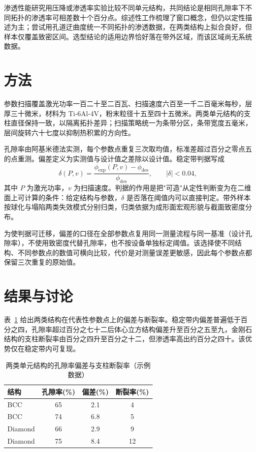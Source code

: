 \documentclass[11pt]{article}
\begin{document}
渗透性能研究用压降或渗透率实验比较不同单元结构，共同结论是相同孔隙率下不同拓扑的渗透率可相差数十个百分点\cite{kumar2018}。综述性工作梳理了窗口概念，但仍以定性描述为主\cite{liu2022}；\cite{zheng2023}尝试用孔道迂曲度统一不同拓扑的渗透数据，在两类结构上拟合良好，但样本仅覆盖致密区间。选型结论的适用边界恰好落在带外区域，而该区域尚无系统数据。

\section{方法}
参数扫描覆盖激光功率一百二十至二百瓦、扫描速度六百至一千二百毫米每秒，层厚三十微米，材料为 Ti-6Al-4V，粉末粒径十五至四十五微米。两类单元结构的支柱直径保持一致，以隔离拓扑差异；扫描策略统一为条带分区，条带宽度五毫米，层间旋转六十七度以抑制热积累的方向性。

孔隙率由阿基米德法实测，每个参数点重复三次取均值，标准差超过百分之零点五的点重测。偏差定义为实测值与设计值之差除以设计值。稳定带判据写成
\begin{equation}
\delta(P,v) = \frac{\phi_{\mathrm{exp}}(P,v) - \phi_{\mathrm{des}}}{\phi_{\mathrm{des}}}, \qquad |\delta| < 0.04,
\end{equation}
其中 $P$ 为激光功率，$v$ 为扫描速度。判据的作用是把"可造"从定性判断变为在二维面上可计算的条件：给定结构与参数，$\delta$ 是否落在阈值内可以直接判定。带外样本按球化与塌陷两类失效模式分别归类，归类依据为成形面宏观形貌与截面致密度分布。

为使判据可迁移，偏差的口径在全部参数点复用同一测量流程与同一基准（设计孔隙率），不使用致密度代替孔隙率，也不按设备单独标定阈值。该选择使不同结构、不同参数点的数值可横向比较，代价是对测量误差更敏感，因此每个参数点都保留三次重复的原始值。

\section{结果与讨论}
表~\ref{tab:main} 给出两类结构在代表性参数点上的偏差与断裂率。稳定带内偏差普遍低于百分之四，孔隙率超过百分之七十二后体心立方结构偏差升至百分之五至九，金刚石结构的支柱断裂率由百分之四升至百分之十二，但渗透率高出约百分之四十。该优势仅在稳定带内可复现。

\begin{table}[htbp]
\centering
\caption{两类单元结构的孔隙率偏差与支柱断裂率（示例数据）}
\label{tab:main}
\begin{tabular}{lccc}
\toprule
结构 & 孔隙率(\%) & 偏差(\%) & 断裂率(\%) \\
\midrule
BCC & 65 & 2.1 & 4 \\
BCC & 74 & 6.8 & 5 \\
Diamond & 66 & 2.9 & 9 \\
Diamond & 75 & 8.4 & 12 \\
\bottomrule
\end{tabular}
\end{table}
\end{document}
